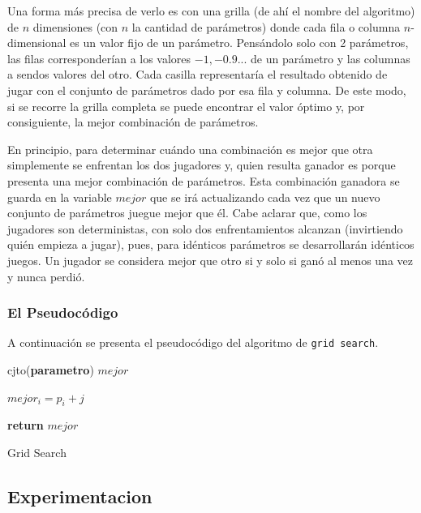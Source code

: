 \documentclass[A4paper,oneside,fleqn,11pt]{article}
\theoremstyle{definition}
\begin{document}
Una forma más precisa de verlo es con una grilla (de ahí el nombre del algoritmo) de $n$ dimensiones (con $n$ la cantidad de parámetros) donde cada fila o columna $n$-dimensional es un valor fijo de un parámetro. Pensándolo solo con 2 parámetros, las filas corresponderían a los valores $-1, -0.9...$ de un parámetro y las columnas a sendos valores del otro. Cada casilla representaría el resultado obtenido de jugar con el conjunto de parámetros dado por esa fila y columna. De este modo, si se recorre la grilla completa se puede encontrar el valor óptimo y, por consiguiente, la mejor combinación de parámetros.

En principio, para determinar cuándo una combinación es mejor que otra simplemente se enfrentan los dos jugadores y, quien resulta ganador es porque presenta una mejor combinación de parámetros. Esta combinación ganadora se guarda en la variable $mejor$ que se irá actualizando cada vez que un nuevo conjunto de parámetros juegue mejor que él. Cabe aclarar que, como los jugadores son deterministas, con solo dos enfrentamientos alcanzan (invirtiendo quién empieza a jugar), pues, para idénticos parámetros se desarrollarán idénticos juegos. Un jugador se considera mejor que otro si y solo si ganó al menos una vez y nunca perdió.
 
\subsubsection{El Pseudocódigo}

A continuación se presenta el pseudocódigo del algoritmo de \texttt{grid search}.

\begin{algorithm}



cjto(\textbf{parametro}) $mejor$

	{
		{	
			{		
			$mejor_i = p_i +j$		
			}
		}
	}

\textbf{return} $mejor$

\caption{Grid Search}
\end{algorithm}

\subsection{Experimentacion}
\end{document}
